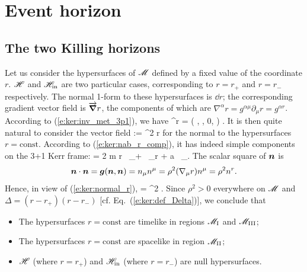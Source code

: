 \section{Event horizon} \label{s:ker:event_hor_gen}

\subsection{The two Killing horizons} \label{s:ker:Killing_hor}

Let us consider the hypersurfaces of $\mathscr{M}$ defined by a fixed value of
the coordinate $r$. $\mathscr{H}$ and $\mathscr{H}_{\rm in}$ are two particular cases,
corresponding to $r=r_+$ and $r=r_-$ respectively.
The normal 1-form to these hypersurfaces is $\dd r$; the corresponding
gradient vector field is $\overrightarrow{\bm{\nabla}} r$, the components of which are
$\nabla^\alpha r = g^{\alpha\mu} \partial_\mu r = g^{\alpha r}$.
According to (\ref{e:ker:inv_met_3p1}), we have
\be \label{e:ker:nab_r_comp}
    \nabla^\alpha r = \left( , , 0, 
            \right) .
\ee
It is then quite natural to consider the vector field
\be \label{e:ker:def_normal_hyp_r}
     := \rho^2 \vw{\nabla} r
\ee
for the normal to the hypersurfaces $r=\mathrm{const}$. According to (\ref{e:ker:nab_r_comp}),
it has indeed simple components on the 3+1 Kerr frame:
\be \label{e:ker:normal_r}
     = 2 m r \, \wpar_\ti + \Delta \, \wpar_{\tilde r} + a \, \wpar_\tph .
\ee
The scalar square of $\bm{n}$ is
\[
    \bm{n}\cdot\bm{n} = \bm{g}(\bm{n},\bm{n}) = n_\mu n^\mu = \rho^2 (\nabla_\mu r) n^\mu
    = \rho^2 n^r .
\]
Hence, in view of (\ref{e:ker:normal_r}),
\be
    \cdot{} = \rho^2 \Delta .
\ee
Since $\rho^2>0$ everywhere on $\mathscr{M}$ and $\Delta = (r-r_+)(r-r_-)$ [cf. Eq.~(\ref{e:ker:def_Delta})], we conclude that
\begin{greybox}
\begin{itemize}
\item The hypersurfaces $r=\mathrm{const}$ are timelike in regions $\mathscr{M}_{\rm I}$ and $\mathscr{M}_{\rm III}$;
\item The hypersurfaces $r=\mathrm{const}$ are spacelike in region $\mathscr{M}_{\rm II}$;
\item $\mathscr{H}$ (where $r=r_+$) and $\mathscr{H}_{\rm in}$ (where $r=r_-$) are null hypersurfaces.
\end{itemize}
\end{greybox}

